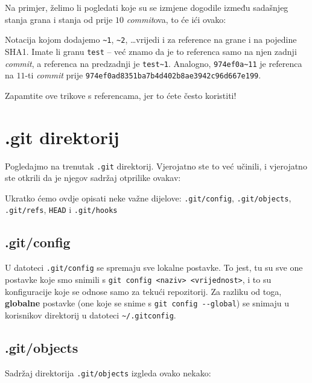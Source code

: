 Na primjer, želimo li pogledati koje su se izmjene dogodile između sadašnjeg stanja grana i stanja od prije $10$ \emph{commit}ova, to će ići ovako:


Notacija kojom dodajemo \verb+~1+, \verb+~2+, \dots vrijedi i za reference na grane i na pojedine SHA1.
Imate li granu \verb+test+ -- već znamo da je to referenca samo na njen zadnji \emph{commit}, a referenca na predzadnji je \verb+test~1+.
Analogno, \verb+974ef0a~11+ je referenca na $11$-ti \emph{commit} prije \verb+974ef0ad8351ba7b4d402b8ae3942c96d667e199+.

Zapamtite ove trikove s referencama, jer to ćete često koristiti!

\section*{.git direktorij}

Pogledajmo na trenutak \verb+.git+ direktorij. 
Vjerojatno ste to već učinili, i vjerojatno ste otkrili da je njegov sadržaj otprilike ovakav:



Ukratko ćemo ovdje opisati neke važne dijelove: \verb+.git/config+, \verb+.git/objects+, \verb+.git/refs+, \verb+HEAD+ i \verb+.git/hooks+

\subsection*{.git/config}

U datoteci \verb+.git/config+ se spremaju sve lokalne postavke.
To jest, tu su sve one postavke koje smo snimili s \verb+git config <naziv> <vrijednost>+, i to su konfiguracije koje se odnose samo za tekući repozitorij.
Za razliku od toga, \textbf{globalne} postavke (one koje se snime s \verb+git config --global+) se snimaju u korisnikov direktorij u datoteci \verb+~/.gitconfig+.

\subsection*{.git/objects}

Sadržaj direktorija \verb+.git/objects+ izgleda ovako nekako:



